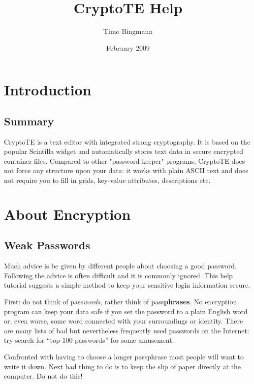 \documentclass[a4paper,12pt,twoside,draft]{article}
\title{CryptoTE Help}
\author{Timo Bingmann}
\date{February 2009}
\begin{document}
\pagestyle{plain}
\maketitle
\tableofcontents

\clearpage
\pagestyle{fancy}

\section{Introduction}\label{Introduction}

\subsection{Summary}\label{Summary}

CryptoTE is a text editor with integrated strong cryptography. It is based on
the popular Scintilla widget and automatically stores text data in secure
encrypted container files. Compared to other "password keeper" programs,
CryptoTE does not force any structure upon your data: it works with plain ASCII
text and does not require you to fill in grids, key-value attributes,
descriptions etc.

\section{About Encryption}\label{AboutEncryption}

\subsection{Weak Passwords}\label{WeakPasswords}

Much advice is be given by different people about choosing a good password. Following the advice is often difficult and it is commonly ignored. This help tutorial suggests a simple method to keep your sensitive login information secure.

First: do not think of pass\emph{words}, rather think of pass\textbf{phrases}. No encryption program can keep your data safe if you set the password to a plain English word or, even worse, some word connected with your surroundings or identity. There are many lists of bad but nevertheless frequently used passwords on the Internet: try search for ``top 100 passwords'' for some amusement.

Confronted with having to choose a longer passphrase most people will want to write it down. Next bad thing to do is to keep the slip of paper directly at the computer. Do not do this!
\end{document}

